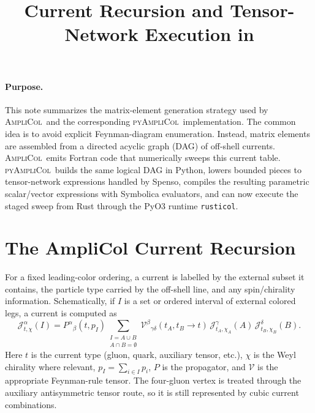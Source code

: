 \documentclass[10pt]{article}
\title{\vspace{-2.0em}Current Recursion and Tensor-Network Execution in \PAC}
\author{}
\date{\vspace{-3.0em}}
\newcommand{\AC}{\textsc{AmpliCol}}
\newcommand{\PAC}{\textsc{pyAmpliCol}}
\newcommand{\J}{\mathcal{J}}
\newcommand{\V}{\mathcal{V}}
\begin{document}
\maketitle
\vspace{-1.2em}

\paragraph{Purpose.}
This note summarizes the matrix-element generation strategy used by \AC\ and
the corresponding \PAC\ implementation.  The common idea is to avoid explicit
Feynman-diagram enumeration.  Instead, matrix elements are assembled from a
directed acyclic graph (DAG) of off-shell currents.  \AC\ emits Fortran code
that numerically sweeps this current table.  \PAC\ builds the same logical DAG
in Python, lowers bounded pieces to tensor-network expressions handled by
Spenso, compiles the resulting parametric scalar/vector expressions with
Symbolica evaluators, and can now execute the staged sweep from Rust through
the PyO3 runtime \texttt{rusticol}.

\section{The AmpliCol Current Recursion}

For a fixed leading-color ordering, a current is labelled by the external
subset it contains, the particle type carried by the off-shell line, and any
spin/chirality information.  Schematically, if $I$ is a set or ordered interval
of external colored legs, a current is computed as
\begin{equation}
  \J^\alpha_{t,\chi}(I)
  =
  P^\alpha{}_\beta(t, p_I)
  \sum_{\substack{I=A\cup B\\A\cap B=\emptyset}}
  \V^\beta{}_{\gamma\delta}(t_A,t_B\to t)\,
  \J^\gamma_{t_A,\chi_A}(A)\,
  \J^\delta_{t_B,\chi_B}(B).
  \label{eq:current-recursion}
\end{equation}
Here $t$ is the current type (gluon, quark, auxiliary tensor, etc.),
$\chi$ is the Weyl chirality where relevant, $p_I=\sum_{i\in I}p_i$, $P$ is
the propagator, and $\V$ is the appropriate Feynman-rule tensor.  The
four-gluon vertex is treated through the auxiliary antisymmetric tensor route,
so it is still represented by cubic current combinations.
\end{document}
